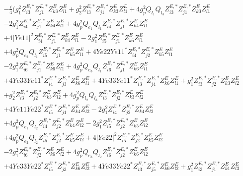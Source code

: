 \begin{align} 
 &-\frac{i}{4} \Big(g_{1}^{2} Z^{E,*}_{i 3} Z^{E,*}_{j 1} Z_{{k 3}}^{E} Z_{{l 1}}^{E} +g_{2}^{2} Z^{E,*}_{i 3} Z^{E,*}_{j 1} Z_{{k 3}}^{E} Z_{{l 1}}^{E} +4 g_{p}^{2} Q_{l_1} Q_{l_3} Z^{E,*}_{i 3} Z^{E,*}_{j 1} Z_{{k 3}}^{E} Z_{{l 1}}^{E} \nonumber \\ 
 &-2 g_{1}^{2} Z^{E,*}_{i 4} Z^{E,*}_{j 1} Z_{{k 4}}^{E} Z_{{l 1}}^{E} +4 g_{p}^{2} Q_{e_{1}} Q_{l_1} Z^{E,*}_{i 4} Z^{E,*}_{j 1} Z_{{k 4}}^{E} Z_{{l 1}}^{E} \nonumber \\ 
 &+4 |Ye11|^2 Z^{E,*}_{i 4} Z^{E,*}_{j 1} Z_{{k 4}}^{E} Z_{{l 1}}^{E} -2 g_{1}^{2} Z^{E,*}_{i 5} Z^{E,*}_{j 1} Z_{{k 5}}^{E} Z_{{l 1}}^{E} \nonumber \\ 
 &+4 g_{p}^{2} Q_{e_{2}} Q_{l_1} Z^{E,*}_{i 5} Z^{E,*}_{j 1} Z_{{k 5}}^{E} Z_{{l 1}}^{E} +4 Ye22 Ye11^* Z^{E,*}_{i 4} Z^{E,*}_{j 2} Z_{{k 5}}^{E} Z_{{l 1}}^{E} \nonumber \\ 
 &-2 g_{1}^{2} Z^{E,*}_{i 6} Z^{E,*}_{j 1} Z_{{k 6}}^{E} Z_{{l 1}}^{E} +4 g_{p}^{2} Q_{e_3} Q_{l_1} Z^{E,*}_{i 6} Z^{E,*}_{j 1} Z_{{k 6}}^{E} Z_{{l 1}}^{E} \nonumber \\ 
 &+4 Ye33 Ye11^* Z^{E,*}_{i 4} Z^{E,*}_{j 3} Z_{{k 6}}^{E} Z_{{l 1}}^{E} +4 Ye33 Ye11^* Z^{E,*}_{i 3} Z^{E,*}_{j 4} Z_{{k 6}}^{E} Z_{{l 1}}^{E} +g_{1}^{2} Z^{E,*}_{i 3} Z^{E,*}_{j 2} Z_{{k 3}}^{E} Z_{{l 2}}^{E} \nonumber \\ 
 &+g_{2}^{2} Z^{E,*}_{i 3} Z^{E,*}_{j 2} Z_{{k 3}}^{E} Z_{{l 2}}^{E} +4 g_{p}^{2} Q_{l_2} Q_{l_3} Z^{E,*}_{i 3} Z^{E,*}_{j 2} Z_{{k 3}}^{E} Z_{{l 2}}^{E} \nonumber \\ 
 &+4 Ye11 Ye22^* Z^{E,*}_{i 5} Z^{E,*}_{j 1} Z_{{k 4}}^{E} Z_{{l 2}}^{E} -2 g_{1}^{2} Z^{E,*}_{i 4} Z^{E,*}_{j 2} Z_{{k 4}}^{E} Z_{{l 2}}^{E} \nonumber \\ 
 &+4 g_{p}^{2} Q_{e_{1}} Q_{l_2} Z^{E,*}_{i 4} Z^{E,*}_{j 2} Z_{{k 4}}^{E} Z_{{l 2}}^{E} -2 g_{1}^{2} Z^{E,*}_{i 5} Z^{E,*}_{j 2} Z_{{k 5}}^{E} Z_{{l 2}}^{E} \nonumber \\ 
 &+4 g_{p}^{2} Q_{e_{2}} Q_{l_2} Z^{E,*}_{i 5} Z^{E,*}_{j 2} Z_{{k 5}}^{E} Z_{{l 2}}^{E} +4 |Ye22|^2 Z^{E,*}_{i 5} Z^{E,*}_{j 2} Z_{{k 5}}^{E} Z_{{l 2}}^{E} \nonumber \\ 
 &-2 g_{1}^{2} Z^{E,*}_{i 6} Z^{E,*}_{j 2} Z_{{k 6}}^{E} Z_{{l 2}}^{E} +4 g_{p}^{2} Q_{e_3} Q_{l_2} Z^{E,*}_{i 6} Z^{E,*}_{j 2} Z_{{k 6}}^{E} Z_{{l 2}}^{E} \nonumber \\ 
 &+4 Ye33 Ye22^* Z^{E,*}_{i 5} Z^{E,*}_{j 3} Z_{{k 6}}^{E} Z_{{l 2}}^{E} +4 Ye33 Ye22^* Z^{E,*}_{i 3} Z^{E,*}_{j 5} Z_{{k 6}}^{E} Z_{{l 2}}^{E} +g_{1}^{2} Z^{E,*}_{i 3} Z^{E,*}_{j 1} Z_{{k 1}}^{E} Z_{{l 3}}^{E} \nonumber \\ 

\end{align}
